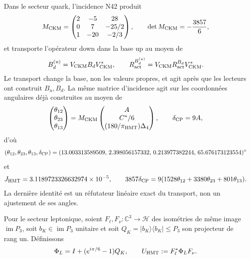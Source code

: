 Dans le secteur quark, l'incidence N42 produit
\begin{equation}
 M_{\rm CKM}=
 \begin{pmatrix}
 2&-5&28\\
 0&7&-25/2\\
 1&-20&-2/3
 \end{pmatrix},
 \qquad \det M_{\rm CKM}=-\frac{3857}{6},
 \label{10j-eq-matriz-ckm}
\end{equation}
et transporte l'opérateur down dans la base up au moyen de
\begin{equation}
 B_d^{(u)}=V_{\rm CKM}B_dV_{\rm CKM}^*,
 \qquad
 R_{\rm act}^{B_d^{(u)}}
 =V_{\rm CKM}R_{\rm act}^{B_d}V_{\rm CKM}^*.
 \label{10j-eq-transporte-ckm}
\end{equation}
Le transport change la base, non les valeurs propres, et agit après que les lecteurs ont construit \(B_u,B_d\). La même matrice d'incidence agit sur les coordonnées angulaires déjà construites au moyen de
\begin{equation}
 \begin{pmatrix}\theta_{12}\\\theta_{23}\\\theta_{13}\end{pmatrix}
 =M_{\rm CKM}
 \begin{pmatrix}
  A\\ C^*/6\\ (180/\pi_{\rm HMT})\Delta_4
 \end{pmatrix},
 \qquad \delta_{\rm CP}=9A,
 \label{10j-eq-angulos-ckm}
\end{equation}
d'où
\begin{equation}
 (\theta_{12},\theta_{23},\theta_{13},\delta_{\rm CP})
 =(13.003313589509,\,2.398056157332,\,0.213977382244,
 \,65.676173123554)^\circ
 \label{10j-eq-salida-ckm}
\end{equation}
et
\begin{equation}
 J_{\rm HMT}=3.1189723326632974\times10^{-5},\qquad
 3857\delta_{\rm CP}
 =9(1528\theta_{12}+3380\theta_{23}+801\theta_{13}).
 \label{10j-eq-falsador-ckm}
\end{equation}
La dernière identité est un réfutateur linéaire exact du transport, non un ajustement de ses angles.

Pour le secteur leptonique, soient \(F_\ell,F_\nu:\mathbb C^3\to\mathcal H\) des isométries de même image \(\operatorname{im}P_3\), soit \(b_K\in\operatorname{im}P_3\) unitaire et soit \(Q_K=|b_K\rangle\langle b_K|\leq P_3\) son projecteur de rang un. Définissons
\begin{equation}
 \Phi_L=I+(e^{i\pi/6}-1)Q_K,
 \qquad U_{\rm HMT}:=F_\ell^*\Phi_LF_\nu.
 \label{10j-eq-unitaria-leptonica}
\end{equation}

